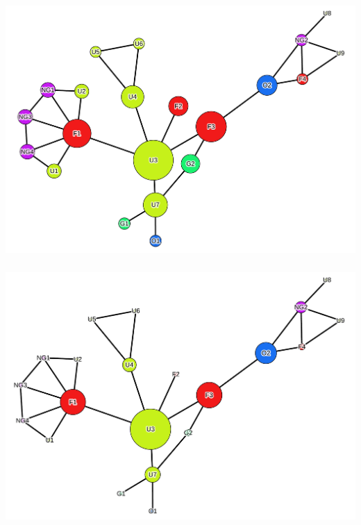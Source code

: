 \documentclass[8pt]{beamer}
\begin{document}
\begin{frame}
\frametitle{\insertsection}
    
\centering
\includegraphics[width=0.9\linewidth,height=\textheight,keepaspectratio]{exercise_closeness_gephi}
     
\end{frame}




\begin{frame}
\frametitle{\insertsection}
    
\centering
\includegraphics[width=0.9\linewidth,height=\textheight,keepaspectratio]{exercise_betweenness_gephi}
     
\end{frame}


\end{document}

